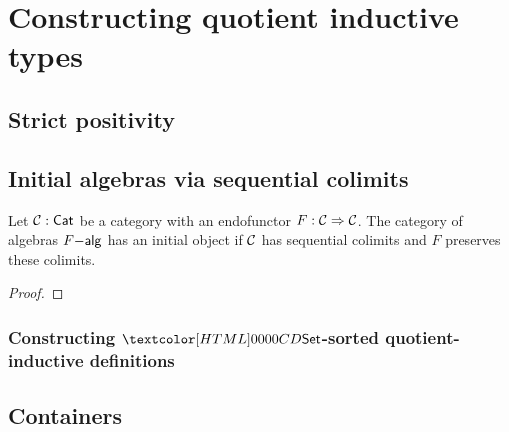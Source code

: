 \chapter{Constructing quotient inductive types}

\section{Strict positivity}

\section{Initial algebras via sequential colimits}


\begin{theorem}[Ad\'amek]
  Let $\mathcal{C} : \mathsf{Cat}$ be a category with an endofunctor
  $F : \mathcal{C} \Rightarrow \mathcal{C}$. The category of algebras $F\mathsf{-alg}$ has an
  initial object if $\mathcal{C}$ has sequential colimits and $F$ preserves
  these colimits.
\end{theorem}

\begin{proof}
  
\end{proof}

\subsection{Constructing $\Set$-sorted quotient-inductive definitions}


\section{Containers}
